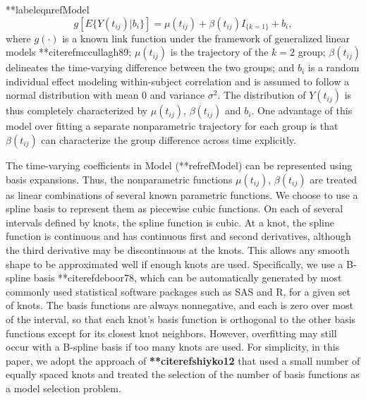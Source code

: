 **labeleqnref{Model}
\begin{equation}
g[E\{Y(t_{ij})|b_{i}\}]=\mu(t_{ij})+\beta(t_{ij})I_{\{k=1\}}+b_i,
\end{equation}
where $g(\cdot)$ is a known link function under the framework of
generalized linear models **citeref{mccullagh89}; $\mu(t_{ij})$ is the
trajectory of the $k=2$ group; $\beta(t_{ij})$ delineates the
time-varying difference between the two groups; and $b_i$ is a
random individual effect modeling within-subject correlation and
is assumed to follow a normal distribution with mean 0 and
variance $\sigma^2$. The distribution of $Y(t_{ij})$ is thus
completely characterized by $\mu(t_{ij})$, $\beta(t_{ij})$ and
$b_i$. One advantage of this model over fitting a separate
nonparametric trajectory for each group is that $\beta(t_{ij})$
can characterize the group difference across time explicitly.


The time-varying coefficients in Model (**refref{Model}) can be
represented using basis expansions. Thus, the nonparametric
functions $\mu(t_{ij})$, $\beta(t_{ij})$ are treated as linear
combinations of several known parametric functions. We choose to
use a spline basis to represent them as piecewise cubic functions.
On each of several intervals defined by knots, the spline function
is cubic. At a knot, the spline function is continuous and has
continuous first and second derivatives, although the third
derivative may be discontinuous at the knots. This allows any
smooth shape to be approximated well if enough knots are used.
Specifically, we use a B-spline basis **citeref{deboor78}, which can
be automatically generated by most commonly used statistical
software packages such as SAS and R, for a given set of knots. The
basis functions are always nonnegative, and each is zero over most
of the interval, so that each knot's basis function is orthogonal
to the other basis functions except for its closest knot
neighbors. However, overfitting may still occur with a B-spline
basis if too many knots are used. For simplicity, in this paper,
we adopt the approach of \textbf{**citeref{shiyko12}} that used a
small number of equally spaced knots and treated the selection of
the number of basis functions as a model selection problem.


